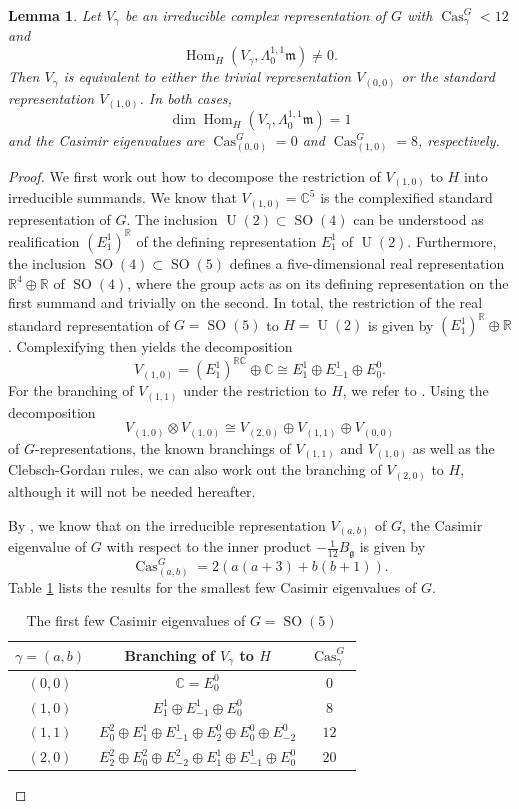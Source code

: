 \documentclass[12pt]{scrartcl}
\theoremstyle{plain}
\newtheorem{lem}[satz]{Lemma}
\theoremstyle{definition}
\newcommand{\R}{\mathbb{R}}%
\newcommand{\C}{\mathbb{C}}%
\newcommand{\Hom}{\operatorname{Hom}}%
\newcommand{\Cas}{\operatorname{Cas}}%
\newcommand{\U}{\operatorname{U}}%
\newcommand{\SO}{\operatorname{SO}}%
\newcommand{\m}{\mathfrak{m}}%
\newcommand{\g}{\mathfrak{g}}%
\begin{document}
\begin{lem}\label{subcrit2}
 Let $V_{\gamma}$ be an irreducible complex representation of $G$ with $\Cas^G_\gamma<12$ and
 \[\Hom_H(V_\gamma,\Lambda^{1,1}_0\m)\neq0.\]
 Then $V_\gamma$ is equivalent to either the trivial representation $V_{(0,0)}$ or the standard representation $V_{(1,0)}$. In both cases,
 \[\dim\Hom_H(V_\gamma,\Lambda^{1,1}_0\m)=1\]
 and the Casimir eigenvalues are $\Cas_{(0,0)}^G=0$ and $\Cas_{(1,0)}^G=8$, respectively.
\end{lem}
\begin{proof}
We first work out how to decompose the restriction of $V_{(1,0)}$ to $H$ into irreducible summands. We know that $V_{(1,0)}=\C^5$ is the complexified standard representation of $G$. The inclusion $\U(2)\subset\SO(4)$ can be understood as realification $(E^1_1)^\R$ of the defining representation $E^1_1$ of $\U(2)$. Furthermore, the inclusion $\SO(4)\subset\SO(5)$ defines a five-dimensional real representation $\R^4\oplus\R$ of $\SO(4)$, where the group acts as on its defining representation on the first summand and trivially on the second. In total, the restriction of the real standard representation of $G=\SO(5)$ to $H=\U(2)$ is given by $(E^1_1)^\R\oplus\R$. Complexifying then yields the decomposition
\[V_{(1,0)}=(E^1_1)^{\R\C}\oplus\C\cong E^1_1\oplus E^1_{-1}\oplus E^0_0.\]
For the branching of $V_{(1,1)}$ under the restriction to $H$, we refer to \cite[Lem.~5.9]{hermitianlaplace}. Using the decomposition
\[V_{(1,0)}\otimes V_{(1,0)}\cong V_{(2,0)}\oplus V_{(1,1)}\oplus V_{(0,0)}\]
of $G$-representations, the known branchings of $V_{(1,1)}$ and $V_{(1,0)}$ as well as the Clebsch-Gordan rules, we can also work out the branching of $V_{(2,0)}$ to $H$, although it will not be needed hereafter.

By \cite[(33)]{hermitianlaplace}, we know that on the irreducible representation $V_{(a,b)}$ of $G$, the Casimir eigenvalue of $G$ with respect to the inner product $-\frac{1}{12}B_{\g}$ is given by
\[\Cas^G_{(a,b)}=2(a(a+3)+b(b+1)).\]
Table \ref{CasSO5} lists the results for the smallest few Casimir eigenvalues of $G$.

\begin{table}[h]
\centering
\begin{tabular}{c|c|c}
$\gamma=(a,b)$&Branching of $V_\gamma$ to $H$&$\Cas^G_\gamma$\\\hline
$(0,0)$&$\C=E^0_0$&0\\
$(1,0)$&$E^1_1\oplus E^1_{-1}\oplus E^0_0$&$8$\\
$(1,1)$&$E^2_0\oplus E^1_1\oplus E^1_{-1}\oplus E^0_2\oplus E^0_0\oplus E^0_{-2}$&$12$\\
$(2,0)$&$E^2_2\oplus E^2_0\oplus E^2_{-2}\oplus E^1_1\oplus E^1_{-1}\oplus E^0_0$&$20$\\
\end{tabular}
\caption{The first few Casimir eigenvalues of $G=\SO(5)$}
\label{CasSO5}
\end{table}


\end{proof}
\end{document}
